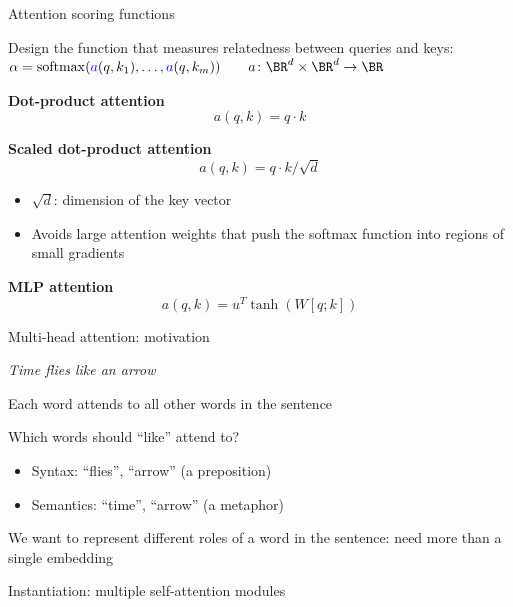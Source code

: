 \documentclass[usenames,dvipsnames,notes,11pt,aspectratio=169,hyperref={colorlinks=true, linkcolor=blue}]{beamer}
\begin{document}
\begin{frame}
    {Attention scoring functions}

    Design the function that measures relatedness between queries and keys:
    ${\alpha}= \mathrm{softmax}({\color{blue}{a}}({q}, k_1), \ldots, {\color{blue}{a}}({q}, k_m)) \quad\quad a\colon \BR^d \times \BR^d \to \BR$
    \pause

    \textbf{Dot-product attention}
    $$
    a(q, k) = q\cdot k
    $$
    \pause

    \textbf{Scaled dot-product attention}
    $$
    a(q, k) = q \cdot k / \sqrt{d} 
    $$
    \vspace{-3em}
    \begin{itemize}
        \item $\sqrt{d}$: dimension of the key vector
        \item Avoids large attention weights that push the softmax function into regions of small gradients
    \end{itemize}
    \pause

    \textbf{MLP attention}
    $$
    a(q, k) = u^T \tanh(W[q;k]) 
    $$
\end{frame}

\begin{frame}
    {Multi-head attention: motivation}
    \begin{center}
        \textit{Time flies like an arrow}
    \end{center}
    \begin{wideitemize}
        \item Each word attends to all other words in the sentence
        \item Which words should ``like'' attend to?
            \pause
            \begin{itemize}
                \item Syntax: ``flies'', ``arrow'' (a preposition)
                \item Semantics: ``time'', ``arrow'' (a metaphor)
            \end{itemize}
        \pause
        \item We want to represent different roles of a word in the sentence: need more than a single embedding
        \item Instantiation: multiple self-attention modules
    \end{wideitemize}
\end{frame}
\end{document}
